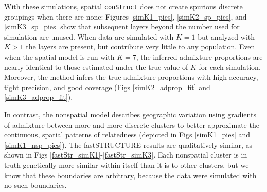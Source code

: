 \documentclass[10pt,letterpaper]{article}
\begin{document}
% 
% 

With these simulations,
spatial \texttt{conStruct} does not create spurious discrete groupings when there are none:
Figures \ref{simK1_pies}, \ref{simK2_sp_pies}, and \ref{simK3_sp_pies} 
show that subsequent layers beyond the number used for simulation are unused.
When data are simulated with $K=1$ but analyzed with $K>1$ 
the layers are present, but contribute very little to any population.
Even when the spatial model is run with $K=7$, 
the inferred admixture proportions are nearly identical to 
those estimated under the true value of $K$ for each simulation.
Moreover, the method infers the true admixture proportions with high accuracy, tight precision, and good coverage 
(Figs \ref{simK2_adprop_fit} and \ref{simK3_adprop_fit}).

In contrast, the nonspatial model describes geographic variation
using gradients of admixture between more and more discrete clusters
to better approximate the continuous, spatial patterns of relatedness
(depicted in Figs \ref{simK1_pies} and \ref{simK1_nsp_pies}).
The fastSTRUCTURE results are qualitatively similar, as shown in Figs \ref{fastStr_simK1}-\ref{fastStr_simK3}.
Each nonspatial cluster is in truth genetically more similar within itself
than it is to other clusters,
but we know that these boundaries are arbitrary,
because the data were simulated with no such boundaries.
\end{document}
